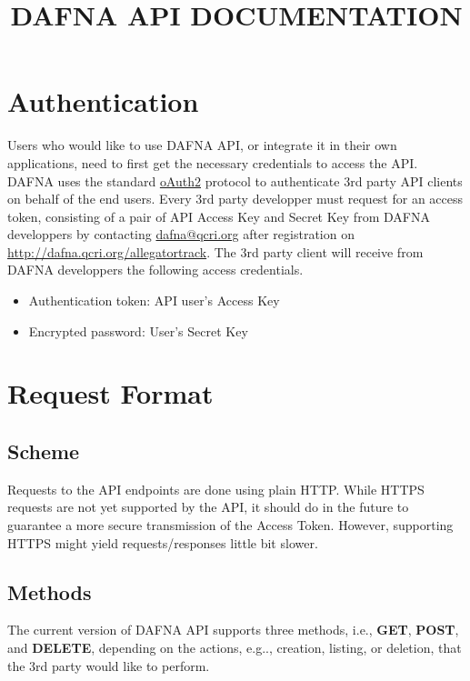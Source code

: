 \documentclass[a4paper,10pt]{scrartcl}
\title{DAFNA API DOCUMENTATION}
\author{}
\begin{document}
\maketitle
\newpage
\tableofcontents
\newpage

\section{Authentication}
Users who would like to use DAFNA API, or integrate it in their own applications,
need to first get the necessary credentials to access the API.
DAFNA uses the standard
\href{http://oauth.net/2/}{oAuth2} protocol to authenticate 3rd party 
API clients on behalf of the end users. Every 3rd party developper must request
for an access token, consisting of
a pair of API Access Key and Secret Key from DAFNA developpers by contacting
\href{dafna@qcri.org}{dafna@qcri.org} after registration on \href{http://dafna.qcri.org/allegatortrack}{http://dafna.qcri.org/allegatortrack}.
The 3rd party client will receive from DAFNA developpers the following access credentials.
\begin{itemize}
 \item Authentication token: API user's Access Key
 \item Encrypted password: User's Secret Key
\end{itemize}

\section{Request Format}
\subsection{Scheme}
Requests to the API endpoints are done using plain HTTP. While HTTPS requests are not yet
supported by the API, it should do in the future to guarantee a more secure transmission of
the Access Token. However, supporting HTTPS might yield requests/responses little bit slower.

\subsection{Methods}
The current version of DAFNA API supports three methods, i.e., \textbf{GET}, \textbf{POST}, and \textbf{DELETE}, 
depending on the actions, e.g.., creation, listing, or deletion, that the 3rd party would like to perform.
\end{document}
